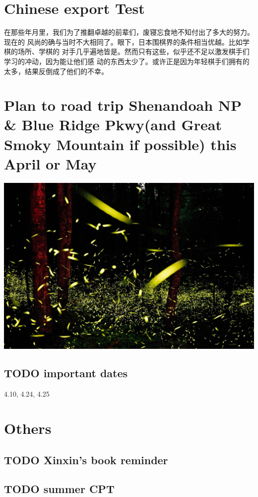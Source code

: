 \documentclass[11pt]{article}
\author{Chuan Liu}
\date{\today}
\title{}
\begin{document}
\section*{Chinese export Test}
\label{sec:orgheadline1}

在那些年月里，我们为了推翻卓越的前辈们，废寝忘食地不知付出了多大的努力。现在的
风尚的确与当时不大相同了。眼下，日本围棋界的条件相当优越。比如学棋的场所、学棋的
对手几乎遍地皆是。然而只有这些，似乎还不足以激发棋手们学习的冲动，因为能让他们感
动的东西太少了。或许正是因为年轻棋手们拥有的太多，结果反倒成了他们的不幸。


\section*{Plan to road trip Shenandoah NP \& Blue Ridge Pkwy(and Great Smoky Mountain if possible) this April or May}
\label{sec:orgheadline3}
\includegraphics[width=.9\linewidth]{./fireflies-great-smoky-mountains.jpg}


\subsection*{{\bfseries\sffamily TODO} important dates}
\label{sec:orgheadline2}
4.10, 4.24, 4.25

\section*{Others}
\label{sec:orgheadline6}

\subsection*{{\bfseries\sffamily TODO} Xinxin's book reminder}
\label{sec:orgheadline4}

\subsection*{{\bfseries\sffamily TODO} summer CPT}
\label{sec:orgheadline5}
\end{document}
